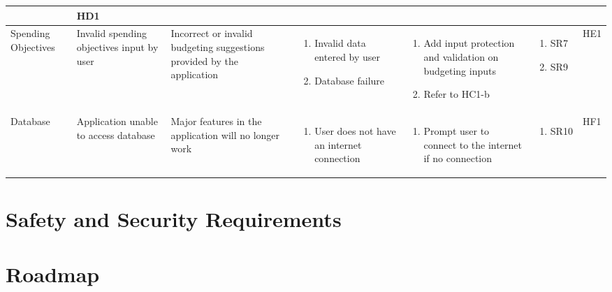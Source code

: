\documentclass{article}
\begin{document}
\begin{landscape}
\begin{longtable}{|p{}|p{}|p{}|p{}|p{}|p{}|p{}|}
        & HD1 \\
        \hline
        Spending Objectives
        & Invalid spending objectives input by user
        & Incorrect or invalid budgeting suggestions provided by the application
        & \begin{enumerate}[label=\alph*., leftmargin=*]
            \item Invalid data entered by user
            \item Database failure
        \end{enumerate}
        & \begin{enumerate}[label=\alph*., leftmargin=*]
            \item Add input protection and validation on budgeting inputs
            \item Refer to HC1-b
        \end{enumerate}
        & \begin{enumerate}[label=\alph*., leftmargin=*]
            \item SR7
            \item SR9
        \end{enumerate}
        & HE1 \\
        \hline
        Database
        & Application unable to access database
        & Major features in the application will no longer work
        & \begin{enumerate}[label=\alph*., leftmargin=*]
            \item User does not have an internet connection
        \end{enumerate}
        & \begin{enumerate}[label=\alph*., leftmargin=*]
            \item Prompt user to connect to the internet if no connection
        \end{enumerate}
        & \begin{enumerate}[label=\alph*., leftmargin=*]
            \item SR10
        \end{enumerate}
        & HF1 \\
        \hline
    \end{longtable}
\end{landscape}

\section{Safety and Security Requirements}


\section{Roadmap}

\end{document}
